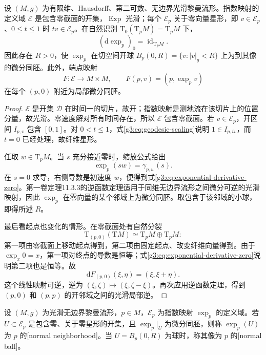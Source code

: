 \begin{proposition}\label{g3:prop:exponential-local}
	设 \((M,g)\) 为有限维、Hausdorff、第二可数、无边界光滑黎曼流形。指数映射的定义域 \(\mathcal E\) 是包含零截面的开集，\(\operatorname{Exp}\) 光滑；每个 \(\mathcal E_p\) 关于零向量星形，即 \(v\in\mathcal E_p\)、\(0\le t\le1\) 时 \(tv\in\mathcal E_p\)。在自然识别 \(\mathrm{T}_0(\mathrm{T}_pM)=\mathrm{T}_pM\) 下，
	\begin{equation}\label{g3:eq:exponential-derivative-zero}
		(\mathrm{d}\exp_p)_0=\operatorname{id}_{\mathrm{T}_pM}.
	\end{equation}
	因此存在 \(R>0\)，使 \(\exp_p\) 在切空间开球 \(B_p(0,R)=\{v:|v|_g<R\}\) 上为到其像的微分同胚。此外，端点映射
	\begin{equation}\label{g3:eq:geodesic-endpoint-map}
		F:\mathcal E\longrightarrow M\times M,\qquad
		F(p,v)=(p,\exp_pv)
	\end{equation}
	在每个 \((p,0)\) 附近为局部微分同胚。
\end{proposition}
\begin{proof}
	\(\mathcal E\) 是开集 \(\mathcal D\) 在时间一的切片，故开；指数映射是测地流在该切片上的位置分量，故光滑。零速度解对所有时间存在，所以 \(\mathcal E\) 包含零截面。若 \(v\in\mathcal E_p\)，开区间 \(I_{p,v}\) 包含 \([0,1]\)。对 \(0<t\le1\)，式\eqref{g3:eq:geodesic-scaling}说明 \(1\in I_{p,tv}\)，而 \(t=0\) 已经处理，故纤维星形。

	任取 \(w\in\mathrm{T}_pM\)。当 \(s\) 充分接近零时，缩放公式给出
	\[
		\exp_p(sw)=\gamma_{p,w}(s).
	\]
	在 \(s=0\) 求导，右侧导数是初速度 \(w\)，便得到式\eqref{g3:eq:exponential-derivative-zero}。第一卷定理11.3.3的逆函数定理适用于同维无边界流形之间微分可逆的光滑映射，因此 \(\exp_p\) 在零向量的某个邻域上为微分同胚。取包含于该邻域的小球，即得所述 \(R\)。

	最后看起点也变化的情形。在零截面处有自然分裂
	\[
		\mathrm{T}_{(p,0)}(\mathrm{T}M)
		\simeq\mathrm{T}_pM\oplus\mathrm{T}_pM:
	\]
	第一项由零截面上移动起点得到，第二项由固定起点、改变纤维向量得到。由于 \(\exp_x0=x\)，第一项对终点的导数是恒等；式\eqref{g3:eq:exponential-derivative-zero}说明第二项也是恒等。故
	\[
		\mathrm{d}F_{(p,0)}(\xi,\eta)=(\xi,\xi+\eta).
	\]
	这个线性映射可逆，逆为 \((\xi,\zeta)\mapsto(\xi,\zeta-\xi)\)。再次应用逆函数定理，得到 \((p,0)\) 和 \((p,p)\) 的开邻域之间的光滑局部逆。
\end{proof}

\begin{definition}\label{g3:def:normal-neighborhood}
	设 \((M,g)\) 为光滑无边界黎曼流形，\(p\in M\)，\(\mathcal E_p\) 为指数映射 \(\exp_p\) 的定义域。若 \(U\subset\mathcal E_p\) 是包含零、关于零星形的开集，且 \(\exp_p|_U\) 为微分同胚，则称 \(\exp_p(U)\) 为 \(p\) 的[normal neighborhood]。当 \(U=B_p(0,R)\) 为球时，称其像为 \(p\) 的[normal ball]。
\end{definition}

